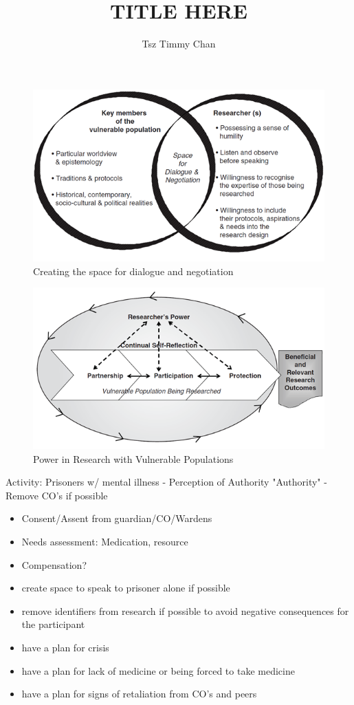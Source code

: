 \documentclass{TC}
\title{TITLE HERE}	%
\author{Tsz Timmy Chan}	%
\begin{document}
\begin{multicols}{2}

\begin{figure}[H]
\centering
\includegraphics[width=.49\textwidth]{dialogue}
\caption{Creating the space for dialogue and negotiation}
\label{dialoguevulnerable}
\end{figure}
\begin{figure}[H]
\centering
\includegraphics[width=.49\textwidth]{power}
\caption{Power in Research with Vulnerable Populations}
\label{powervulnerable}
\end{figure}

\end{multicols}

Activity: Prisoners w/ mental illness - Perception of Authority
"Authority" - Remove CO's if possible
\begin{itemize}
\item Consent/Assent from guardian/CO/Wardens
\item Needs assessment: Medication, resource 
\item Compensation? 
\item create space to speak to prisoner alone if possible
\item remove identifiers from research if possible to avoid negative consequences for the participant
\item have a plan for crisis 
\item have a plan for lack of medicine or being forced to take medicine
\item have a plan for signs of retaliation from CO's and peers
\end{itemize}
\end{document}
